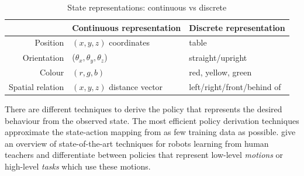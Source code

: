 \begin{table}[ht]
	\centering
	\caption{State representations: continuous vs discrete}
	\label{tab:representations}
	\begin{tabular}{r|ll}
		& Continuous representation & Discrete representation\\ \hline
		Position & $(x,y,z)$ coordinates & table \\
		Orientation & ($\theta_x,\theta_y,\theta_z$) & straight/upright \\
		Colour & $(r,g,b)$ & red, yellow, green\\
		Spatial relation & $(x,y,z)$ distance vector & left/right/front/behind of 
	\end{tabular}
\end{table}

There are different techniques to derive the policy that represents the desired behaviour from the observed state.
The most efficient policy derivation techniques approximate the state-action mapping from as few training data as possible.
\cite{chernova2014robot} give an overview of state-of-the-art techniques for robots learning from human teachers and differentiate between policies that represent low-level \textit{motions} or high-level \textit{tasks} which use these motions. 


